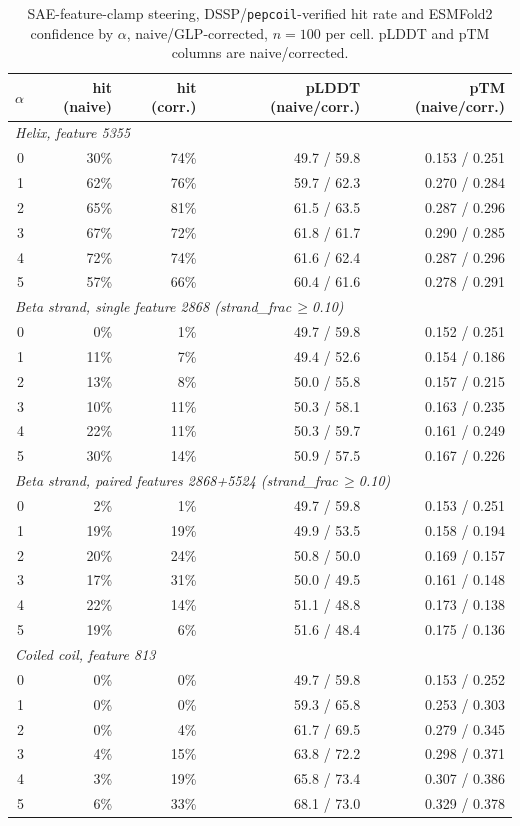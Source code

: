 \documentclass{article}
\begin{document}
\begin{table}[htbp]
\centering
\caption{SAE-feature-clamp steering, DSSP/\texttt{pepcoil}-verified hit rate and ESMFold2
confidence by $\alpha$, naive/GLP-corrected, $n{=}100$ per cell. pLDDT and pTM columns are
naive/corrected.}
\label{tab:steer-sae-clamp}
\begin{tabular}{rrrrr}
\toprule
$\alpha$ & hit (naive) & hit (corr.) & pLDDT (naive/corr.) & pTM (naive/corr.) \\
\midrule
\multicolumn{5}{l}{\textit{Helix, feature 5355}} \\
0 & 30\% & 74\% & 49.7 / 59.8 & 0.153 / 0.251 \\
1 & 62\% & 76\% & 59.7 / 62.3 & 0.270 / 0.284 \\
2 & 65\% & 81\% & 61.5 / 63.5 & 0.287 / 0.296 \\
3 & 67\% & 72\% & 61.8 / 61.7 & 0.290 / 0.285 \\
4 & 72\% & 74\% & 61.6 / 62.4 & 0.287 / 0.296 \\
5 & 57\% & 66\% & 60.4 / 61.6 & 0.278 / 0.291 \\
\cmidrule(lr){1-5}
\multicolumn{5}{l}{\textit{Beta strand, single feature 2868 (strand\_frac$\,\ge$0.10)}} \\
0 & 0\% & 1\% & 49.7 / 59.8 & 0.152 / 0.251 \\
1 & 11\% & 7\% & 49.4 / 52.6 & 0.154 / 0.186 \\
2 & 13\% & 8\% & 50.0 / 55.8 & 0.157 / 0.215 \\
3 & 10\% & 11\% & 50.3 / 58.1 & 0.163 / 0.235 \\
4 & 22\% & 11\% & 50.3 / 59.7 & 0.161 / 0.249 \\
5 & 30\% & 14\% & 50.9 / 57.5 & 0.167 / 0.226 \\
\cmidrule(lr){1-5}
\multicolumn{5}{l}{\textit{Beta strand, paired features 2868+5524 (strand\_frac$\,\ge$0.10)}} \\
0 & 2\% & 1\% & 49.7 / 59.8 & 0.153 / 0.251 \\
1 & 19\% & 19\% & 49.9 / 53.5 & 0.158 / 0.194 \\
2 & 20\% & 24\% & 50.8 / 50.0 & 0.169 / 0.157 \\
3 & 17\% & 31\% & 50.0 / 49.5 & 0.161 / 0.148 \\
4 & 22\% & 14\% & 51.1 / 48.8 & 0.173 / 0.138 \\
5 & 19\% & 6\% & 51.6 / 48.4 & 0.175 / 0.136 \\
\cmidrule(lr){1-5}
\multicolumn{5}{l}{\textit{Coiled coil, feature 813}} \\
0 & 0\% & 0\% & 49.7 / 59.8 & 0.153 / 0.252 \\
1 & 0\% & 0\% & 59.3 / 65.8 & 0.253 / 0.303 \\
2 & 0\% & 4\% & 61.7 / 69.5 & 0.279 / 0.345 \\
3 & 4\% & 15\% & 63.8 / 72.2 & 0.298 / 0.371 \\
4 & 3\% & 19\% & 65.8 / 73.4 & 0.307 / 0.386 \\
5 & 6\% & 33\% & 68.1 / 73.0 & 0.329 / 0.378 \\
\bottomrule
\end{tabular}
\end{table}
\end{document}
